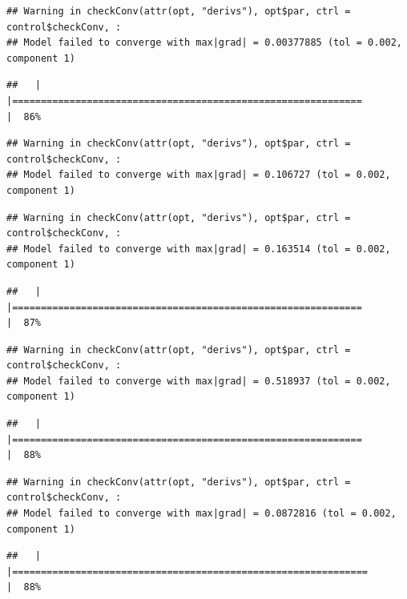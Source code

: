 \documentclass[
  12pt,
]{book}
\begin{document}
\begin{verbatim}
## Warning in checkConv(attr(opt, "derivs"), opt$par, ctrl = control$checkConv, :
## Model failed to converge with max|grad| = 0.00377885 (tol = 0.002, component 1)
\end{verbatim}

\begin{verbatim}
##   |                                                                              |=============================================================         |  86%
\end{verbatim}

\begin{verbatim}
## Warning in checkConv(attr(opt, "derivs"), opt$par, ctrl = control$checkConv, :
## Model failed to converge with max|grad| = 0.106727 (tol = 0.002, component 1)
\end{verbatim}

\begin{verbatim}
## Warning in checkConv(attr(opt, "derivs"), opt$par, ctrl = control$checkConv, :
## Model failed to converge with max|grad| = 0.163514 (tol = 0.002, component 1)
\end{verbatim}

\begin{verbatim}
##   |                                                                              |=============================================================         |  87%
\end{verbatim}

\begin{verbatim}
## Warning in checkConv(attr(opt, "derivs"), opt$par, ctrl = control$checkConv, :
## Model failed to converge with max|grad| = 0.518937 (tol = 0.002, component 1)
\end{verbatim}

\begin{verbatim}
##   |                                                                              |=============================================================         |  88%
\end{verbatim}

\begin{verbatim}
## Warning in checkConv(attr(opt, "derivs"), opt$par, ctrl = control$checkConv, :
## Model failed to converge with max|grad| = 0.0872816 (tol = 0.002, component 1)
\end{verbatim}

\begin{verbatim}
##   |                                                                              |==============================================================        |  88%
\end{verbatim}
\end{document}
